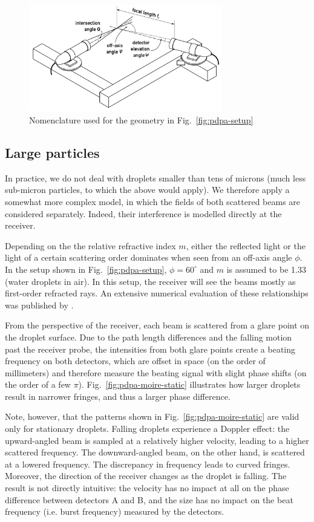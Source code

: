 \documentclass[11.5pt,oneside]{book}
\newcommand*{\figref}[1]{Fig.~\ref{#1}}
\begin{document}
\begin{figure}
    \centering
    \includegraphics[width=0.75\textwidth]{img/setup/pdpa_angles.pdf}
    \caption{Nomenclature used for the geometry in \figref{fig:pdpa-setup} \label{fig:pdpa-angles}}
\end{figure}

\subsection{Large particles}
In practice, we do not deal with droplets smaller than tens of microns (much
less sub-micron particles, to which the above would apply). We therefore apply a
somewhat more complex model, in which the fields of both scattered beams are
considered separately. Indeed, their interference is modelled directly at the
receiver.

Depending on the the relative refractive index $m$, either the reflected light
or the light of a certain scattering order dominates when seen from an off-axis
angle $\phi$. In the setup shown in \figref{fig:pdpa-setup}, $\phi = 60^\circ$
and $m$ is assumed to be 1.33 (water droplets in air). In this setup, the
receiver will see the beams mostly as first-order refracted rays. An extensive
numerical evaluation of these relationships was published by \citet{Naqwi96}.

From the perspective of the receiver, each beam is scattered from a glare point
on the droplet surface. Due to the path length differences and the falling
motion past the receiver probe, the intensities from both glare points create a
beating frequency on both detectors, which are offset in space (on the order of
millimeters) and therefore measure the beating signal with slight phase shifts
(on the order of a few $\pi$). \figref{fig:pdpa-moire-static} illustrates how larger
droplets result in narrower fringes, and thus a larger phase difference.

Note, however, that the patterns shown in \figref{fig:pdpa-moire-static} are
valid only for stationary droplets. Falling droplets experience a Doppler
effect: the upward-angled beam is sampled at a relatively higher velocity,
leading to a higher scattered frequency. The downward-angled beam, on the other
hand, is scattered at a lowered frequency. The discrepancy in frequency leads to
curved fringes. Moreover, the direction of the receiver changes as the droplet
is falling. The result is not directly intuitive: the velocity has no impact at
all on the phase difference between detectors A and B, and the size has no
impact on the beat frequency (i.e. burst frequency) measured by the detectors.
\end{document}
